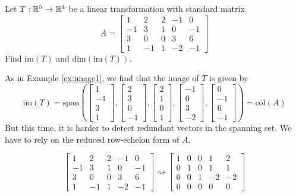 \documentclass{ximera}
\begin{document}
\begin{example}\label{ex:image2}
Let $T:\mathbb{R}^5\rightarrow \mathbb{R}^4$ be a linear transformation with standard matrix $$A=\begin{bmatrix}1 & 2 & 2 &-1 & 0\\-1 & 3 & 1 & 0 & -1\\3 & 0 & 0 & 3 & 6\\ 1 & -1 & 1 & -2 & -1\end{bmatrix}$$
Find $\text{im}(T)$ and $\text{dim}(\text{im}(T))$.
\begin{explanation}
As in Example \ref{ex:image1}, we find that the image of $T$ is given by
$$\text{im}(T)=\text{span}\left(\begin{bmatrix}1\\-1\\3\\1\end{bmatrix}, \begin{bmatrix}2\\3\\0\\-1\end{bmatrix}, \begin{bmatrix}2\\1\\0\\1\end{bmatrix}, \begin{bmatrix}-1\\0\\3\\-2\end{bmatrix}, \begin{bmatrix}0\\-1\\6\\-1\end{bmatrix}\right)=\text{col}(A)$$
But this time, it is harder to detect redundant vectors in the spanning set.  We have to rely on the reduced row-echelon form of $A$.

$$\begin{bmatrix}1 & 2 & 2 &-1 & 0\\-1 & 3 & 1 & 0 & -1\\3 & 0 & 0 & 3 & 6\\ 1 & -1 & 1 & -2 & -1\end{bmatrix}  \rightsquigarrow \begin{bmatrix} 1 & 0 & 0 & 1 & 2\\0 & 1 & 0 & 1 & 1\\0 & 0 & 1 & -2 & -2\\ 0 & 0 & 0 & 0 & 0 \end{bmatrix}$$


\end{explanation}
\end{example}
\end{document}

